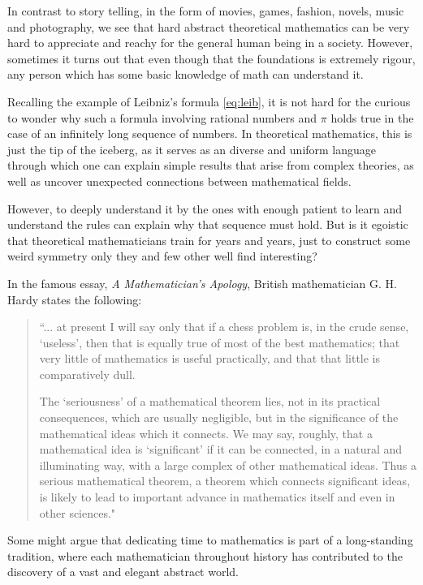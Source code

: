 \documentclass[10pt,twocolumn]{article}
\begin{document}
\begin{sloppy}
In contrast to story telling, in the form of movies, games, fashion, novels, music and photography, we see that hard abstract theoretical mathematics can be very hard to appreciate and reachy for the general human being in a society. However,
sometimes it turns out that even though that the foundations is extremely rigour, any person which has some basic knowledge of math can understand it.

Recalling the example of Leibniz's formula \eqref{eq:leib}, it is not hard for the curious to wonder why such a formula involving rational numbers and $\pi$ holds true in the case of an infinitely long sequence of numbers. In theoretical mathematics,
this is just the tip of the iceberg, as it serves as an diverse and uniform language through which one can explain simple results that arise from complex theories, as well as uncover unexpected connections between mathematical fields.

However, to deeply understand it by the ones with enough patient to learn and understand the rules can explain why that sequence must hold.
     But is it egoistic that theoretical mathematicians train for years and years, just to construct some weird symmetry only they and few other well find interesting?

In the famous essay, \textit{A Mathematician's Apology}, British mathematician G. H. Hardy states the following:
\begin{quote}
``... at present I will say only that if a chess problem is, in the crude sense, ‘useless’, then that is equally true of most of the best mathematics; that very little of mathematics is useful practically, and that that little is comparatively dull.

The ‘seriousness’ of a mathematical theorem lies, not in its practical consequences, which are usually negligible, but in the significance of the mathematical ideas which it connects. We may say, roughly, that a mathematical idea is ‘significant’ if it can be connected, in a natural and illuminating way, with a large complex of other mathematical ideas. Thus a serious mathematical theorem, a theorem which connects significant ideas, is likely to lead to important advance in mathematics itself and even in other sciences."
\end{quote}

Some might argue that dedicating time to mathematics is part of a long-standing tradition, where each mathematician throughout history has contributed to the discovery of a vast and elegant abstract world.




    \printbibliography
\end{sloppy}
\end{document}
